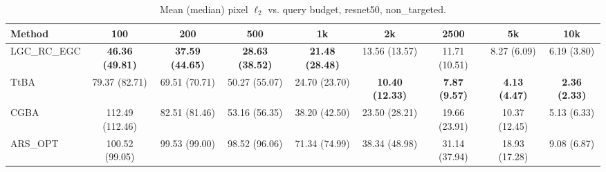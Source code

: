 \begin{table}[t]
\centering\footnotesize
\caption{Mean (median) pixel $\ell_2$ vs. query budget, resnet50, non\_targeted.}
\begin{tabular}{lcccccccc}
\toprule
Method & 100 & 200 & 500 & 1k & 2k & 2500 & 5k & 10k \\
\midrule
LGC\_RC\_EGC & \textbf{46.36 (49.81)} & \textbf{37.59 (44.65)} & \textbf{28.63 (38.52)} & \textbf{21.48 (28.48)} & 13.56 (13.57) & 11.71 (10.51) & 8.27 (6.09) & 6.19 (3.80) \\
TtBA & 79.37 (82.71) & 69.51 (70.71) & 50.27 (55.07) & 24.70 (23.70) & \textbf{10.40 (12.33)} & \textbf{7.87 (9.57)} & \textbf{4.13 (4.47)} & \textbf{2.36 (2.33)} \\
CGBA & 112.49 (112.46) & 82.51 (81.46) & 53.16 (56.35) & 38.20 (42.50) & 23.50 (28.21) & 19.66 (23.91) & 10.37 (12.45) & 5.13 (6.33) \\
ARS\_OPT & 100.52 (99.05) & 99.53 (99.00) & 98.52 (96.06) & 71.34 (74.99) & 38.34 (48.98) & 31.14 (37.94) & 18.93 (17.28) & 9.08 (6.87) \\
\bottomrule
\end{tabular}
\end{table}
